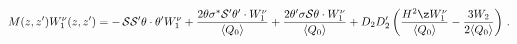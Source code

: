 \begin{equation*}
M(z,z')W_{1}^{\nu}(z,z')= -\,{\cal S }{\cal S' }
\theta\cdot\theta'  W_{1}^{\nu}+\frac{2\theta\sigma^{*}{\cal
S}'\theta'\cdot
 W_{1}^{\nu}}{\langle
Q_0 \rangle} +\frac{2\theta' \sigma{\cal S}\theta\cdot
W_{1}^{\nu}}{\langle Q_0 \rangle} +D_2D_2'\left(\frac{H^{2}\z
W_{1}^{\nu}}{\langle Q_0 \rangle}-\frac{3W_{2}}{2\langle Q_0
\rangle}\right)\,.
\end{equation*}


